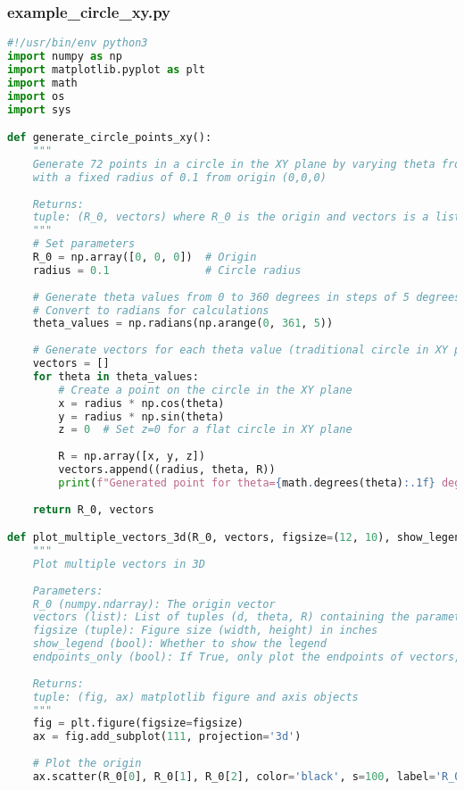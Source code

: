 \subsubsection{example\_circle\_xy.py}

\begin{lstlisting}[language=Python]
#!/usr/bin/env python3
import numpy as np
import matplotlib.pyplot as plt
import math
import os
import sys

def generate_circle_points_xy():
    """
    Generate 72 points in a circle in the XY plane by varying theta from 0 to 360 degrees
    with a fixed radius of 0.1 from origin (0,0,0)
    
    Returns:
    tuple: (R_0, vectors) where R_0 is the origin and vectors is a list of (d, theta, R) tuples
    """
    # Set parameters
    R_0 = np.array([0, 0, 0])  # Origin
    radius = 0.1               # Circle radius
    
    # Generate theta values from 0 to 360 degrees in steps of 5 degrees
    # Convert to radians for calculations
    theta_values = np.radians(np.arange(0, 361, 5))
    
    # Generate vectors for each theta value (traditional circle in XY plane)
    vectors = []
    for theta in theta_values:
        # Create a point on the circle in the XY plane
        x = radius * np.cos(theta)
        y = radius * np.sin(theta)
        z = 0  # Set z=0 for a flat circle in XY plane
        
        R = np.array([x, y, z])
        vectors.append((radius, theta, R))
        print(f"Generated point for theta={math.degrees(theta):.1f} deg: {R}")
    
    return R_0, vectors

def plot_multiple_vectors_3d(R_0, vectors, figsize=(12, 10), show_legend=True, endpoints_only=True):
    """
    Plot multiple vectors in 3D
    
    Parameters:
    R_0 (numpy.ndarray): The origin vector
    vectors (list): List of tuples (d, theta, R) containing the parameters and vectors
    figsize (tuple): Figure size (width, height) in inches
    show_legend (bool): Whether to show the legend
    endpoints_only (bool): If True, only plot the endpoints of vectors, not the arrows
    
    Returns:
    tuple: (fig, ax) matplotlib figure and axis objects
    """
    fig = plt.figure(figsize=figsize)
    ax = fig.add_subplot(111, projection='3d')
    
    # Plot the origin
    ax.scatter(R_0[0], R_0[1], R_0[2], color='black', s=100, label='R_0')
    

\end{lstlisting}
